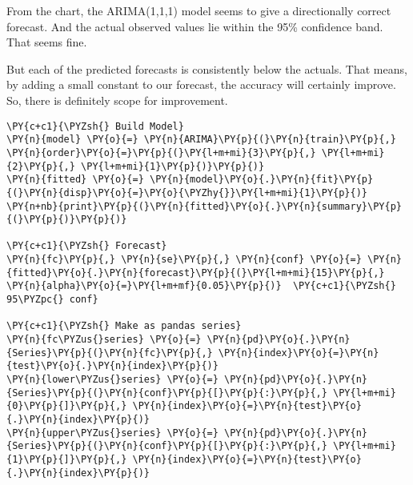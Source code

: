 \begin{center}
\end{center}
    
From the chart, the ARIMA(1,1,1) model seems to give a directionally
correct forecast. And the actual observed values lie within the 95\%
confidence band. That seems fine.

But each of the predicted forecasts is consistently below the actuals.
That means, by adding a small constant to our forecast, the accuracy
will certainly improve. So, there is definitely scope for improvement.


\begin{tcolorbox}[breakable, size=fbox, boxrule=1pt, pad at break*=1mm,colback=cellbackground, colframe=cellborder]
\begin{Verbatim}[commandchars=\\\{\}]
\PY{c+c1}{\PYZsh{} Build Model}
\PY{n}{model} \PY{o}{=} \PY{n}{ARIMA}\PY{p}{(}\PY{n}{train}\PY{p}{,} \PY{n}{order}\PY{o}{=}\PY{p}{(}\PY{l+m+mi}{3}\PY{p}{,} \PY{l+m+mi}{2}\PY{p}{,} \PY{l+m+mi}{1}\PY{p}{)}\PY{p}{)}  
\PY{n}{fitted} \PY{o}{=} \PY{n}{model}\PY{o}{.}\PY{n}{fit}\PY{p}{(}\PY{n}{disp}\PY{o}{=}\PY{o}{\PYZhy{}}\PY{l+m+mi}{1}\PY{p}{)}  
\PY{n+nb}{print}\PY{p}{(}\PY{n}{fitted}\PY{o}{.}\PY{n}{summary}\PY{p}{(}\PY{p}{)}\PY{p}{)}

\PY{c+c1}{\PYZsh{} Forecast}
\PY{n}{fc}\PY{p}{,} \PY{n}{se}\PY{p}{,} \PY{n}{conf} \PY{o}{=} \PY{n}{fitted}\PY{o}{.}\PY{n}{forecast}\PY{p}{(}\PY{l+m+mi}{15}\PY{p}{,} \PY{n}{alpha}\PY{o}{=}\PY{l+m+mf}{0.05}\PY{p}{)}  \PY{c+c1}{\PYZsh{} 95\PYZpc{} conf}

\PY{c+c1}{\PYZsh{} Make as pandas series}
\PY{n}{fc\PYZus{}series} \PY{o}{=} \PY{n}{pd}\PY{o}{.}\PY{n}{Series}\PY{p}{(}\PY{n}{fc}\PY{p}{,} \PY{n}{index}\PY{o}{=}\PY{n}{test}\PY{o}{.}\PY{n}{index}\PY{p}{)}
\PY{n}{lower\PYZus{}series} \PY{o}{=} \PY{n}{pd}\PY{o}{.}\PY{n}{Series}\PY{p}{(}\PY{n}{conf}\PY{p}{[}\PY{p}{:}\PY{p}{,} \PY{l+m+mi}{0}\PY{p}{]}\PY{p}{,} \PY{n}{index}\PY{o}{=}\PY{n}{test}\PY{o}{.}\PY{n}{index}\PY{p}{)}
\PY{n}{upper\PYZus{}series} \PY{o}{=} \PY{n}{pd}\PY{o}{.}\PY{n}{Series}\PY{p}{(}\PY{n}{conf}\PY{p}{[}\PY{p}{:}\PY{p}{,} \PY{l+m+mi}{1}\PY{p}{]}\PY{p}{,} \PY{n}{index}\PY{o}{=}\PY{n}{test}\PY{o}{.}\PY{n}{index}\PY{p}{)}


\end{Verbatim}
\end{tcolorbox}
